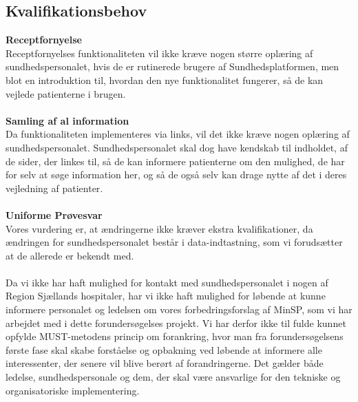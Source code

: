 \subsection{Kvalifikationsbehov}
\textbf{Receptfornyelse} \\
Receptfornyelses funktionaliteten vil ikke kræve nogen større oplæring af sundhedspersonalet, hvis de er rutinerede brugere af Sundhedsplatformen, men blot en introduktion til, hvordan den nye funktionalitet fungerer, så de kan vejlede patienterne i brugen.
\\\\
\textbf{Samling af al information} \\
Da funktionaliteten implementeres via links, vil det ikke kræve nogen oplæring af sundhedspersonalet. Sundhedspersonalet skal dog have kendskab til indholdet, af de sider, der linkes til, så de kan informere patienterne om den mulighed, de har for selv at søge information her, og så de også selv kan drage nytte af det i deres vejledning af patienter.
\\\\
\textbf{Uniforme Prøvesvar} \\
Vores vurdering er, at ændringerne ikke kræver ekstra kvalifikationer, da ændringen for sundhedspersonalet består i data-indtastning, som vi forudsætter at de allerede er bekendt med.\\\\
Da vi ikke har haft mulighed for kontakt med sundhedspersonalet i nogen af Region Sjællands hospitaler, har vi ikke haft mulighed for løbende at kunne informere personalet og ledelsen om vores forbedringsforslag af MinSP, som vi har arbejdet med i dette forundersøgelses projekt. Vi har derfor ikke til fulde kunnet opfylde MUST-metodens princip om forankring, hvor man fra forundersøgelsens første fase skal skabe forståelse og opbakning ved løbende at informere alle interessenter, der senere vil blive berørt af forandringerne. Det gælder både ledelse, sundhedspersonale og dem, der skal være ansvarlige for den tekniske og organisatoriske implementering.
